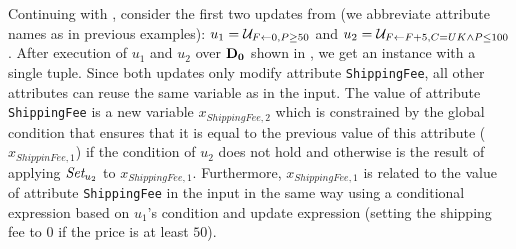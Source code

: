 %
\begin{exam}\label{ex:up-vctb}
Continuing with , consider the first two updates from  (we abbreviate attribute names as in previous examples): $u_1 = \mathcal{U}_{F \gets 0,P \geq 50}$  %
and $u_2 = \mathcal{U}_{F \gets F + 5,C = UK \land P \leq 100}$. %
After execution of $u_1$ and $u_2$ over $\mathbf{D_0}$ shown in , we get an instance with a single tuple. Since both updates only modify attribute \texttt{ShippingFee}, all other attributes can reuse the same variable as in the input.  %
The value of attribute \texttt{ShippingFee} is a new variable $x_{ShippingFee,2}$ which is constrained by the global condition that ensures that it is equal to the previous value of this attribute ($x_{ShippinFee,1}$) if the condition of $u_2$ does not hold and otherwise is the result of applying  $\textit{Set}_{u_2}$ to $x_{ShippingFee,1}$. Furthermore, $x_{ShippingFee,1}$ is related to the value of attribute \texttt{ShippingFee} in the input in the same way using a conditional expression based on $u_1$'s condition and update expression (setting the shipping fee to $0$ if the price is at least $50$).

\end{exam}
